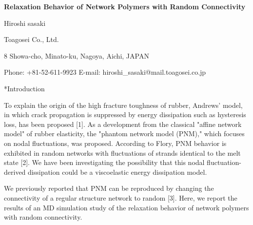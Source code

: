 \documentclass[uplatex,dvipdfmx,a4paper,12pt]{article}
\makeatletter
\def\section{\@startsection {section}{1}{\z@}{1.5 ex plus 2ex minus -.2ex}{0.5 ex plus .2ex}{\bf}}
\makeatother
\begin{document}
\begin{center}
\textbf{Relaxation Behavior of Network Polymers with Random Connectivity}

\vspace{\baselineskip}
Hiroshi sasaki

\vspace{0.5\baselineskip}
Toagosei Co., Ltd.

8 Showa-cho, Minato-ku, Nagoya, Aichi, JAPAN

Phone: +81-52-611-9923 E-mail: hiroshi\_sasaki@mail.toagosei.co.jp
\end{center}

\section*{Introduction}

To explain the origin of the high fracture toughness of rubber, Andrews' model, in which crack propagation is suppressed by energy dissipation such as hysteresis loss, has been proposed [1].
As a development from the classical "affine network model" of rubber elasticity, the "phantom network model (PNM)," which focuses on nodal fluctuations, was proposed.
According to Flory, PNM behavior is exhibited in random networks with fluctuations of strands identical to the melt state [2].
We have been investigating the possibility that this nodal fluctuation-derived dissipation could be a viscoelastic energy dissipation model.

We previously reported that PNM can be reproduced by changing the connectivity of a regular structure network to random [3].
Here, we report the results of an MD simulation study of the relaxation behavior of network polymers with random connectivity.


\end{document}
